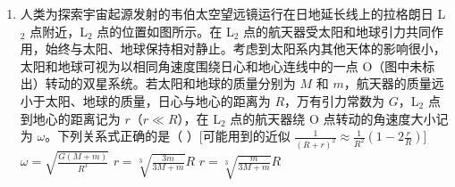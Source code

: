 \documentclass[\gkver]{gaokaozhenti}
\begin{document}
\begin{enumerate}
{$I_{6} = mv_{6}$，$I_{6} = S_{0 \sim 6}$ = $2\UNs$

则可知乙车在 $t$ = 2 $\Us$和 $t$ = 6 $\Us$ 时的速度相同，故 B 正确；

C．根据图（a）可知，2 \textasciitilde{} 6 $\Us$ 内甲车的位移为 0；根据图（b）可知，2 \textasciitilde{} 6 $\Us$ 内乙车一直向正方向运动，则 2 \textasciitilde{} 6 $\Us$ 内，甲、乙两车的位移不同，故 C 正确；

D．根据图（a）可知，$t$ = 8 $\Us$ 时甲车的速度为 0，则 $t$ = 8 $\Us$ 时，甲车的动能为 0；乙车在 0 \textasciitilde{} 8 $\Us$ 内根据动量定理有

$I_{8} = mv_{8}$，$I_{8} = S_{0 ~ 8}$ = 0

可知 $t$ = 8 $\Us$ 时乙车的速度为 0，则 $t$ = 8 $\Us$ 时，乙车的动能为 0，故 D 错误。

故选 BC。
}

\item
人类为探索宇宙起源发射的韦伯太空望远镜运行在日地延长线上的拉格朗日 L$_{2}$ 点附近，L$_{2}$ 点的位置如图所示。在 L$_{2}$ 点的航天器受太阳和地球引力共同作用，始终与太阳、地球保持相对静止。考虑到太阳系内其他天体的影响很小，太阳和地球可视为以相同角速度围绕日心和地心连线中的一点 O（图中未标出）转动的双星系统。若太阳和地球的质量分别为 $M$ 和 $m$，航天器的质量远小于太阳、地球的质量，日心与地心的距离为 $R$，万有引力常数为 $G$，L$_{2}$ 点到地心的距离记为 $r$（$r \ll R$），在 L$_{2}$ 点的航天器绕 O 点转动的角速度大小记为 $\omega$。下列关系式正确的是（   ）[可能用到的近似 $\frac{1}{{{{(R + r)}^2}}} \approx \frac{1}{{{R^2}}}\left( {1 - 2\frac{r}{R}} \right)$]
{$\omega = \sqrt {\frac{{G(M + m)}}{{{R^3}}}} $}
{$r = \sqrt[3]{{\frac{{3m}}{{3M + m}}}} R$}
{$r = \sqrt[3]{{\frac{{m}}{{3M + m}}}} R$}
\end{enumerate}
\end{document}
